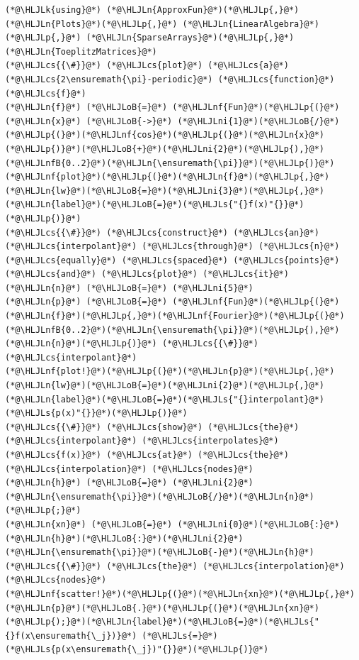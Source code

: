 \documentclass[12pt,a4paper]{article}
\newcommand{\HLJLk}[1]{\textcolor[RGB]{148,91,176}{\textbf{#1}}}
\newcommand{\HLJLn}[1]{#1}
\newcommand{\HLJLnf}[1]{\textcolor[RGB]{66,102,213}{#1}}
\newcommand{\HLJLs}[1]{\textcolor[RGB]{201,61,57}{#1}}
\newcommand{\HLJLnfB}[1]{\textcolor[RGB]{59,151,46}{#1}}
\newcommand{\HLJLni}[1]{\textcolor[RGB]{59,151,46}{#1}}
\newcommand{\HLJLoB}[1]{\textcolor[RGB]{102,102,102}{\textbf{#1}}}
\newcommand{\HLJLp}[1]{#1}
\newcommand{\HLJLcs}[1]{\textcolor[RGB]{153,153,119}{\textit{#1}}}
\begin{document}
\begin{lstlisting}
(*@\HLJLk{using}@*) (*@\HLJLn{ApproxFun}@*)(*@\HLJLp{,}@*) (*@\HLJLn{Plots}@*)(*@\HLJLp{,}@*) (*@\HLJLn{LinearAlgebra}@*)(*@\HLJLp{,}@*) (*@\HLJLn{SparseArrays}@*)(*@\HLJLp{,}@*) (*@\HLJLn{ToeplitzMatrices}@*)
(*@\HLJLcs{{\#}}@*) (*@\HLJLcs{plot}@*) (*@\HLJLcs{a}@*) (*@\HLJLcs{2\ensuremath{\pi}-periodic}@*) (*@\HLJLcs{function}@*) (*@\HLJLcs{f}@*)
(*@\HLJLn{f}@*) (*@\HLJLoB{=}@*) (*@\HLJLnf{Fun}@*)(*@\HLJLp{(}@*)(*@\HLJLn{x}@*) (*@\HLJLoB{->}@*) (*@\HLJLni{1}@*)(*@\HLJLoB{/}@*)(*@\HLJLp{(}@*)(*@\HLJLnf{cos}@*)(*@\HLJLp{(}@*)(*@\HLJLn{x}@*)(*@\HLJLp{)}@*)(*@\HLJLoB{+}@*)(*@\HLJLni{2}@*)(*@\HLJLp{),}@*)(*@\HLJLnfB{0..2}@*)(*@\HLJLn{\ensuremath{\pi}}@*)(*@\HLJLp{)}@*)
(*@\HLJLnf{plot}@*)(*@\HLJLp{(}@*)(*@\HLJLn{f}@*)(*@\HLJLp{,}@*)(*@\HLJLn{lw}@*)(*@\HLJLoB{=}@*)(*@\HLJLni{3}@*)(*@\HLJLp{,}@*)(*@\HLJLn{label}@*)(*@\HLJLoB{=}@*)(*@\HLJLs{"{}f(x)"{}}@*)(*@\HLJLp{)}@*)
(*@\HLJLcs{{\#}}@*) (*@\HLJLcs{construct}@*) (*@\HLJLcs{an}@*) (*@\HLJLcs{interpolant}@*) (*@\HLJLcs{through}@*) (*@\HLJLcs{n}@*) (*@\HLJLcs{equally}@*) (*@\HLJLcs{spaced}@*) (*@\HLJLcs{points}@*) (*@\HLJLcs{and}@*) (*@\HLJLcs{plot}@*) (*@\HLJLcs{it}@*)
(*@\HLJLn{n}@*) (*@\HLJLoB{=}@*) (*@\HLJLni{5}@*)
(*@\HLJLn{p}@*) (*@\HLJLoB{=}@*) (*@\HLJLnf{Fun}@*)(*@\HLJLp{(}@*)(*@\HLJLn{f}@*)(*@\HLJLp{,}@*)(*@\HLJLnf{Fourier}@*)(*@\HLJLp{(}@*)(*@\HLJLnfB{0..2}@*)(*@\HLJLn{\ensuremath{\pi}}@*)(*@\HLJLp{),}@*)(*@\HLJLn{n}@*)(*@\HLJLp{)}@*) (*@\HLJLcs{{\#}}@*) (*@\HLJLcs{interpolant}@*)
(*@\HLJLnf{plot!}@*)(*@\HLJLp{(}@*)(*@\HLJLn{p}@*)(*@\HLJLp{,}@*)(*@\HLJLn{lw}@*)(*@\HLJLoB{=}@*)(*@\HLJLni{2}@*)(*@\HLJLp{,}@*)(*@\HLJLn{label}@*)(*@\HLJLoB{=}@*)(*@\HLJLs{"{}interpolant}@*) (*@\HLJLs{p(x)"{}}@*)(*@\HLJLp{)}@*)
(*@\HLJLcs{{\#}}@*) (*@\HLJLcs{show}@*) (*@\HLJLcs{the}@*) (*@\HLJLcs{interpolant}@*) (*@\HLJLcs{interpolates}@*) (*@\HLJLcs{f(x)}@*) (*@\HLJLcs{at}@*) (*@\HLJLcs{the}@*) (*@\HLJLcs{interpolation}@*) (*@\HLJLcs{nodes}@*)
(*@\HLJLn{h}@*) (*@\HLJLoB{=}@*) (*@\HLJLni{2}@*)(*@\HLJLn{\ensuremath{\pi}}@*)(*@\HLJLoB{/}@*)(*@\HLJLn{n}@*)(*@\HLJLp{;}@*)
(*@\HLJLn{xn}@*) (*@\HLJLoB{=}@*) (*@\HLJLni{0}@*)(*@\HLJLoB{:}@*)(*@\HLJLn{h}@*)(*@\HLJLoB{:}@*)(*@\HLJLni{2}@*)(*@\HLJLn{\ensuremath{\pi}}@*)(*@\HLJLoB{-}@*)(*@\HLJLn{h}@*) (*@\HLJLcs{{\#}}@*) (*@\HLJLcs{the}@*) (*@\HLJLcs{interpolation}@*) (*@\HLJLcs{nodes}@*)
(*@\HLJLnf{scatter!}@*)(*@\HLJLp{(}@*)(*@\HLJLn{xn}@*)(*@\HLJLp{,}@*)(*@\HLJLn{p}@*)(*@\HLJLoB{.}@*)(*@\HLJLp{(}@*)(*@\HLJLn{xn}@*)(*@\HLJLp{);}@*)(*@\HLJLn{label}@*)(*@\HLJLoB{=}@*)(*@\HLJLs{"{}f(x\ensuremath{\_j})}@*) (*@\HLJLs{=}@*) (*@\HLJLs{p(x\ensuremath{\_j})"{}}@*)(*@\HLJLp{)}@*)
\end{lstlisting}
\end{document}
